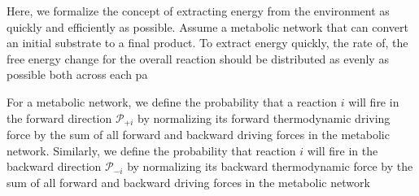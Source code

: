 Here, we formalize the concept of extracting energy from the environment as quickly and efficiently as possible. Assume a metabolic network that can convert an initial substrate to a final product. To extract energy quickly, the rate of, the free energy change for the overall reaction should be distributed as evenly as possible both across each pa


For a metabolic network, we define the probability that a reaction $i$ will fire in the forward  direction ${\mathcal P_{+i}}$ by normalizing its forward thermodynamic driving force by the sum of all forward and backward driving forces in the metabolic network. Similarly, we define the probability that reaction $i$ will fire in the backward direction $\mathcal P_{-i}$ by normalizing its backward thermodynamic force by  the sum of all forward and backward driving forces in the metabolic network